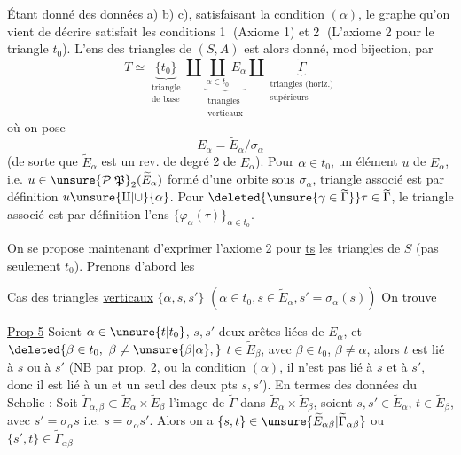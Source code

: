 Étant donné des données a) b) c), satisfaisant la condition $(\alpha)$, le graphe qu'on vient de décrire satisfait les conditions \textcircled{1} (Axiome 1) et \textcircled{2} (L'axiome 2 pour le  triangle $t_0$). L'ens  des triangles de $(S,A)$ est alors donné, mod bijection, par
\[
T\simeq\underbrace{\{t_0\}}_{\substack{\text{triangle}\\\text{de base}}}\amalg
\underbrace{\coprod_{\alpha\in t_0}E_\alpha}_{\substack{\text{triangles}\\\text{verticaux}}}\amalg
\underbrace{\widetilde\Gamma}_{\substack{\text{triangles (horiz.)}\\\text{supérieurs}}}
\]
où on pose 
\[
E_\alpha=\widetilde E_\alpha/\sigma_\alpha
\]
(de sorte que $\widetilde E_\alpha$ est un rev. de degré 2 de $E_\alpha$). Pour $\alpha\in t_0$, un élément $u$ de $E_\alpha$, i.e. $u\in\unsure{\mathcal P|\mathfrak P}_2(\widetilde E_\alpha)$ formé d'une orbite sous $\sigma_\alpha$,  triangle  associé est par définition \deleted{\unsure{$\{$}}$u\unsure{\amalg|\cup}\{\alpha\}$. Pour $\deleted{\unsure{\gamma\in\widetilde\Gamma}}\tau\in\widetilde\Gamma$, le triangle associé est par définition l'ens  $\{\varphi_\alpha(\tau)\}_{\alpha\in t_0}$.

 On se propose maintenant d'exprimer l'axiome 2 pour \uline{ts} les triangles de $S$ (pas seulement $t_0$). Prenons d'abord les

Cas des triangles \uline{verticaux} $\{\alpha,s,s'\}$ $(\alpha\in t_0,s\in\widetilde E_\alpha,s'=\sigma_\alpha(s))$ On trouve

\uline{Prop 5} \quad Soient $\alpha\in\unsure{t|t_0}$, $s,s'$ deux arêtes liées de $E_\alpha$, et $\deleted{\beta\in t_0,\ \beta\ne\unsure{\beta|\alpha},}$ $t\in\widetilde E_\beta$, avec $\beta\in t_0$, $\beta\ne\alpha$, alors $t$ est lié à  $s$ ou à $s'$ (\uline{NB} par prop. 2, ou  la condition $(\alpha)$,  il n'est pas lié à $s$ \uline{et} à $s'$, donc il est lié à un et un seul des deux pts $s,s'$). En termes des données du Scholie : Soit $\widetilde\Gamma_{\alpha,\beta}\subset\widetilde E_\alpha\times\widetilde E_\beta$ l'image de $\widetilde\Gamma$ dans $\widetilde E_\alpha\times\widetilde E_\beta$, soient $s,s'\in\widetilde E_\alpha$, $t\in\widetilde E_\beta$, avec $s'=\sigma_\alpha s$ i.e. $s=\sigma_\alpha s'$. Alors on a $\{s,t\}\in\unsure{\widetilde E_{\alpha\beta}|\widetilde\Gamma_{\alpha\beta}}$ ou $\{s',t\}\in\widetilde\Gamma_{\alpha\beta}$


